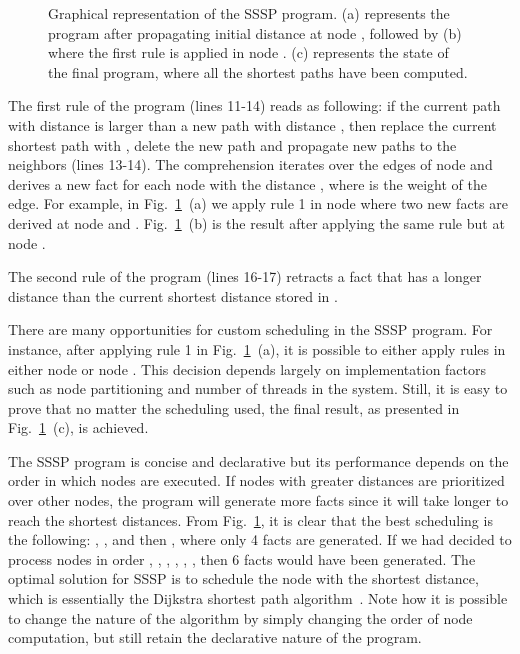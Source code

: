 \begin{figure}
\begin{center}
\begin{subfigure}[b]{0.4\textwidth}
      \caption{}
   \end{subfigure}
\end{center}
\caption{Graphical representation of the SSSP program. (a) represents the
   program after propagating initial distance at node , followed by
   (b) where the first rule is applied in node . (c)
   represents the state of the final program, where all the shortest paths
   have been computed.}
\label{fig:shortest_path_program}
\end{figure}

The first rule of the program (lines 11-14) reads as following: if the current
 path  with distance  is larger than a
new path  with distance , then replace the current
shortest path with , delete the new  path and propagate
new paths to the neighbors (lines 13-14).  The comprehension iterates over the
edges of node  and derives a new  fact for each node
 with the distance , where  is the weight of
the edge. For example, in Fig.~\ref{fig:shortest_path_program}~(a) we apply rule
1 in node  where two new  facts are derived at node
 and . Fig.~\ref{fig:shortest_path_program}~(b) is the
result after applying the same rule but at node .

The second rule of the program (lines 16-17) retracts a  fact
that has a longer distance than the current shortest distance stored in
.

There are many opportunities for custom scheduling in the SSSP program. For
instance, after applying rule 1 in Fig.~\ref{fig:shortest_path_program}~(a), it
is possible to either apply rules in either node  or node
. This decision depends largely on implementation factors such as
node partitioning and number of threads in the system.  Still, it is easy to
prove that no matter the scheduling used, the final result, as presented in
Fig.~\ref{fig:shortest_path_program}~(c), is achieved.

The SSSP program is concise and declarative but its performance depends on the
order in which nodes are executed. If nodes with greater distances are
prioritized over other nodes, the program will generate more 
facts since it will take longer to reach the shortest distances. From
Fig.~\ref{fig:shortest_path_program}, it is clear that the best scheduling is
the following: , ,  and then , where
only 4  facts are generated. If we had decided to process nodes in
order , , , , ,
, then 6  facts would have been generated.  The optimal
solution for SSSP is to schedule the node with the shortest distance, which is
essentially the Dijkstra shortest path algorithm~\cite{Dijkstra}. Note how it is
possible to change the nature of the algorithm by simply changing the order of
node computation, but still retain the declarative nature of the program.

